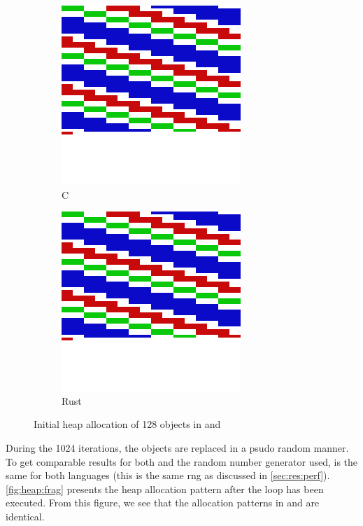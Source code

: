 \begin{figure}[H]

  \centering
  \begin{subfigure}{0.47\textwidth}
    \centering
    \includegraphics[scale=0.25]{results/plots/heap/cinit}
    \caption{C}
    \label{fig:heap:init:c}
  \end{subfigure}
  \hfill
  \begin{subfigure}{0.47\textwidth}
      \centering
    \includegraphics[scale=0.25]{results/plots/heap/rinit}
    \caption{Rust}
    \label{fig:heap:init:r}
  \end{subfigure}
  \caption{Initial heap allocation of 128 objects in {\rust} and {\C}}
  \label{fig:heap:init}

\end{figure}

During the 1024 iterations, the objects are replaced in a psudo random manner.
To get comparable results for both {\C} and {\rust} the random number generator used, is the same for both languages (this is the same \gls{rng} as discussed in \autoref{sec:res:perf}).
\autoref{fig:heap:frag} presents the heap allocation pattern after the loop has been executed.
From this figure, we see that the allocation patterns in {\rust} and {\C} are identical.

